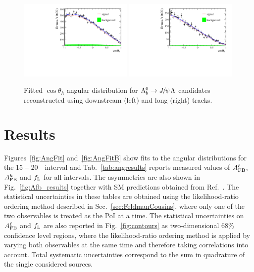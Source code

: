 %
\begin{figure}[h]
\centering
\includegraphics[width=0.49\textwidth]{Lmumu/figs/AngularDistribs/Fitted/AfbB_DD_jpsi.pdf}
\includegraphics[width=0.49\textwidth]{Lmumu/figs/AngularDistribs/Fitted/AfbB_LL_jpsi.pdf}
\caption{Fitted $\cos\theta_h$ angular distribution for $\Lb\to\jpsi\Lz$ candidates
reconstructed using downstream (left) and long (right) tracks.  }
\label{fig:AngFitBJpsi}
\end{figure}
%






\section{Results}
\label{sec:afb_results}

Figures~\ref{fig:AngFit} and~\ref{fig:AngFitB} show fits to the angular distributions
for the 15 -- 20~\gevgevcccc ~\qsq interval and 
%
Tab.~\ref{tab:angresults} reports measured values of $A_{\rm FB}^\ell$, $A_{\rm FB}^h$ and $f_{\rm L}$ for all intervals.
The asymmetries are also shown in Fig.~\ref{fig:Afb_results} together with SM predictions obtained from 
Ref.~\cite{Detmold:2012vy}. The statistical uncertainties in these tables 
are obtained using the likelihood-ratio ordering method described in Sec.~\ref{sec:FeldmanCousins}, where only
one of the two observables is treated as the PoI at a time. The statistical uncertainties
on $A_{\rm FB}^\ell$ and $f_{\rm L}$ are also reported in Fig.~\ref{fig:contours} as two-dimensional 68\% confidence level regions,
where the likelihood-ratio ordering method is applied by varying both observables at the same time and therefore taking
correlations into account. Total systematic uncertainties correspond to the sum in quadrature of the
single considered sources.

